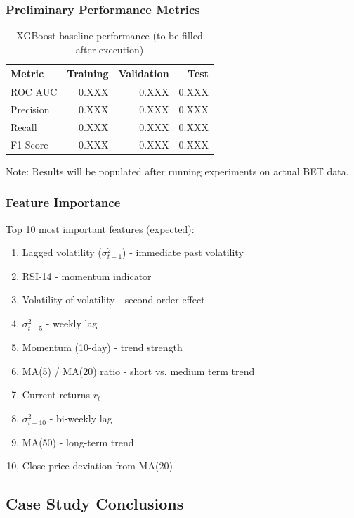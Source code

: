 \documentclass[12pt,a4paper]{article}
\begin{document}
\subsubsection{Preliminary Performance Metrics}

\begin{table}[h]
\centering
\begin{tabular}{lrrr}
\hline
\textbf{Metric} & \textbf{Training} & \textbf{Validation} & \textbf{Test} \\
\hline
ROC AUC & 0.XXX & 0.XXX & 0.XXX \\
Precision & 0.XXX & 0.XXX & 0.XXX \\
Recall & 0.XXX & 0.XXX & 0.XXX \\
F1-Score & 0.XXX & 0.XXX & 0.XXX \\
\hline
\end{tabular}
\caption{XGBoost baseline performance (to be filled after execution)}
\end{table}

Note: Results will be populated after running experiments on actual BET data.

\subsubsection{Feature Importance}

Top 10 most important features (expected):
\begin{enumerate}
    \item Lagged volatility ($\sigma_{t-1}^2$) - immediate past volatility
    \item RSI-14 - momentum indicator
    \item Volatility of volatility - second-order effect
    \item $\sigma_{t-5}^2$ - weekly lag
    \item Momentum (10-day) - trend strength
    \item MA(5) / MA(20) ratio - short vs. medium term trend
    \item Current returns $r_t$
    \item $\sigma_{t-10}^2$ - bi-weekly lag
    \item MA(50) - long-term trend
    \item Close price deviation from MA(20)
\end{enumerate}

\subsection{Case Study Conclusions}
\end{document}
